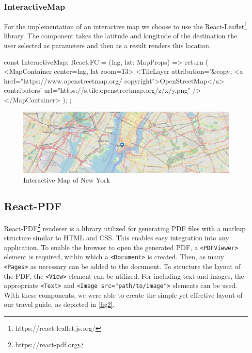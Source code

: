 \documentclass[english,notitlepage,smartquotes]{hgbreport}
\begin{document}
\subsubsection{InteractiveMap} \label{InteractiveMap}
For the implementation of an interactive map we choose to use the React-Leaflet\footnote{https://react-leaflet.js.org/} library. The component takes the latitude and longitude of the destination the user selected as parameters and then as a result renders this location.
\begin{PythonCode}
const InteractiveMap: React.FC = ({lng, lat}: MapProps) => {
	return (
		<MapContainer center={{lng, lat}} zoom={13}>
			<TileLayer attribution='&copy; <a href="https://www.openstreetmap.org/
					copyright">OpenStreetMap</a> contributors'
					url="https://{s}.tile.openstreetmap.org/{z}/{x}/{y}.png"
			/>
		</MapContainer>
	);
};
\end{PythonCode}
\begin{figure}[H]
	\centering
	\includegraphics[width=1\textwidth]{interactiveMap.png}
	\caption{Interactive Map of New York}
	\label{figInteractiveMap}
\end{figure}

\subsection{React-PDF} \label{ReactPDF}

React-PDF\footnote{https://react-pdf.org} renderer is a library utilized for generating PDF files with a markup structure similar to HTML and CSS. This enables easy integration into any application. To enable the browser to open the generated PDF, a \texttt{<PDFViewer>} element is required, within which a \texttt{<Document>} is created. Then, as many \texttt{<Pages>} as necessary can be added to the document. To structure the layout of the PDF, the \texttt{<View>} element can be utilized. For including text and images, the appropriate \texttt{<Text>} and \texttt{<Image src="path/to/image">} elements can be used. With these components, we were able to create the simple yet effective layout of our travel guide, as depicted in \ref{fig2}.
\end{document}
